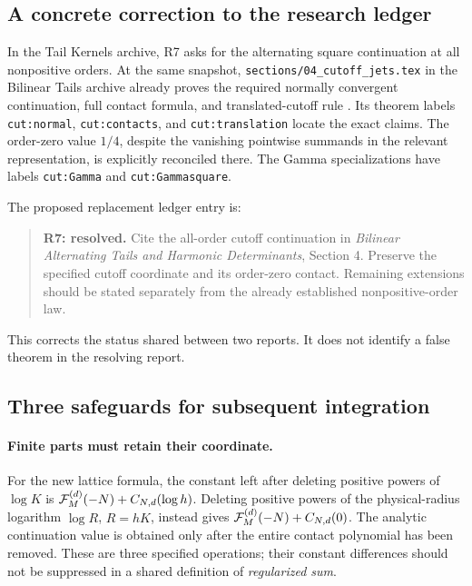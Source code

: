 \subsection{A concrete correction to the research ledger}

In the Tail Kernels archive, R7 asks for the alternating square
continuation at all nonpositive orders. At the same snapshot,
\texttt{sections/04\_cutoff\_jets.tex} in the Bilinear Tails
archive already proves the required normally convergent
continuation, full contact formula, and translated-cutoff rule
\cite{RepoTailKernels,RepoBilinear}. Its theorem labels
\texttt{cut:normal}, \texttt{cut:contacts}, and
\texttt{cut:translation} locate the exact claims.
The order-zero value \(1/4\), despite the vanishing
pointwise summands in the relevant representation, is explicitly
reconciled there. The Gamma specializations have labels
\texttt{cut:Gamma} and \texttt{cut:Gammasquare}.

The proposed replacement ledger entry is:
\begin{quote}
\textbf{R7: resolved.} Cite the all-order cutoff continuation in
\emph{Bilinear Alternating Tails and Harmonic Determinants},
Section 4. Preserve the specified cutoff coordinate and its
order-zero contact. Remaining extensions should be stated
separately from the already established nonpositive-order law.
\end{quote}
This corrects the status shared between two reports. It does not
identify a false theorem in the resolving report.

\subsection{Three safeguards for subsequent integration}

\paragraph{Finite parts must retain their coordinate.}
For the new lattice formula, the constant left after deleting
positive powers of \(\log K\) is
\({\cal F}_M^{(d)}(-N)+C_{N,d}(\log h)\).
Deleting positive powers of the physical-radius logarithm
\(\log R\), \(R=hK\), instead gives
\({\cal F}_M^{(d)}(-N)+C_{N,d}(0)\).
The analytic continuation value is obtained only after the entire
contact polynomial has been removed. These are three specified
operations; their constant differences should not be suppressed
in a shared definition of \emph{regularized sum}.

